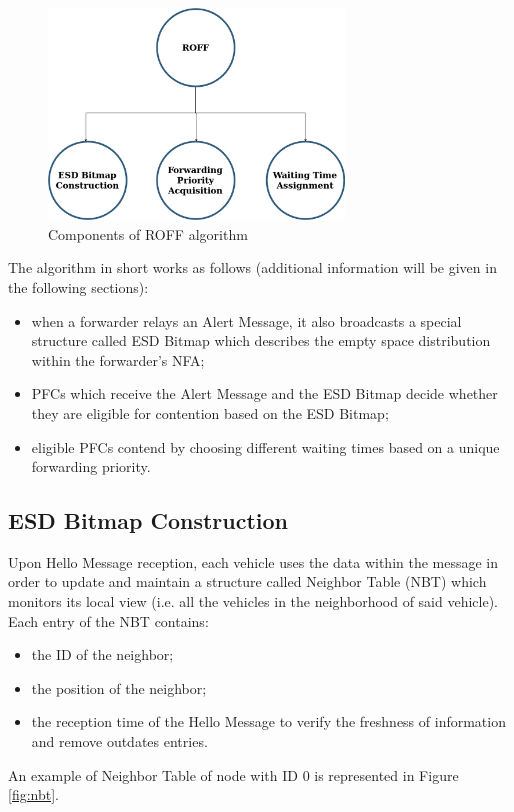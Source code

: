 		\begin{figure}[H]
			\centering
			\includegraphics[width=0.7\textwidth]{immagini/roffAlgo}
			\caption{Components of ROFF algorithm}
			\label{fig:roffAlgo}
		\end{figure}
	
		The algorithm in short works as follows (additional information will be given in the following sections):
		\begin{itemize}
			\item when a forwarder relays an Alert Message, it also broadcasts a special structure called ESD Bitmap which describes the empty space distribution within the forwarder's NFA;
			\item PFCs which receive the Alert Message and the ESD Bitmap decide whether they are eligible for contention based on the ESD Bitmap;
			\item eligible PFCs contend by choosing different waiting times based on a unique forwarding priority.
		\end{itemize}
	
		\subsection{ESD Bitmap Construction}
			Upon Hello Message reception, each vehicle uses the data within the message in order to update and maintain a structure called Neighbor Table (NBT) which monitors its local view (i.e. all the vehicles in the neighborhood of said vehicle). Each entry of the NBT contains:
			\begin{itemize}
				\item the ID of the neighbor;
				\item the position of the neighbor;
				\item the reception time of the Hello Message to verify the freshness of information and remove outdates entries.
			\end{itemize}
			An example of Neighbor Table of node with ID 0 is represented in Figure \ref{fig:nbt}.
				

